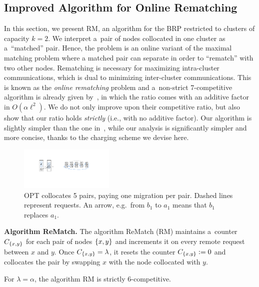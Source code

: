 \documentclass[a4paper,anonymous,USenglish]{lipics-v2019}
\newcommand{\OPT}{\textsc{OPT}\xspace}
\newcommand{\OBRP}{BRP\xspace}
\newcommand{\RM}{\textsc{RM}\xspace} %
\DeclarePairedDelimiter\set{\{}{\}}
\begin{document}
\subsection{Improved Algorithm for Online Rematching} \label{sec:k2}
In this section,
we present \RM,
 an algorithm for the \OBRP restricted to clusters of capacity $k=2$.
We interpret a~pair of nodes collocated in one cluster as a~``matched'' pair.
Hence,
the problem is an online variant of the maximal matching problem where
a matched pair can separate in order to ``rematch'' with two other nodes.
Rematching is necessary for  maximizing intra-cluster communications,
which is dual to minimizing inter-cluster communications.
This is known as the  \emph{online rematching} 
problem and a~non-strict 7-competitive algorithm is already given by~\cite{repartition-disc},
in which the ratio comes with an additive factor in $O(\alpha\ell^2)$.
We do not only improve upon their competitive ratio,
but also show that our ratio holds \emph{strictly}
(i.e., with no additive factor).
Our algorithm is slightly simpler than the one in~\cite{repartition-disc}, 
while our analysis is significantly  simpler and more concise,
thanks to the charging scheme we devise here.

\begin{figure}[H]
	\centering
	\includegraphics[width=0.4\textwidth]{figs/cyclic}
	\caption{
		\OPT  collocates 5 pairs, paying one migration per pair.
	Dashed lines represent requests.
	An arrow, e.g.~from $b_1$ to $a_1$ means  that $b_1$ replaces $a_1$. }
	\label{fig:cyclic}
\end{figure}


\noindent
\textbf{Algorithm ReMatch.} 
The algorithm ReMatch (\RM) maintains a~counter $C_{\set{x,y}}$ for each pair of nodes $\set{x,y}$ and increments it on every remote request between $x$ and $y$.
Once $C_{\set{x,y}} = \lambda$,
it resets the counter $C_{\set{x,y}}:=0$ and collocates the pair by swapping $x$ with the node collocated with $y$.


\begin{theorem} \label{thm:k=2}
	For $\lambda=\alpha$, the algorithm \RM  is strictly 6-competitive.
\end{theorem}
\end{document}
